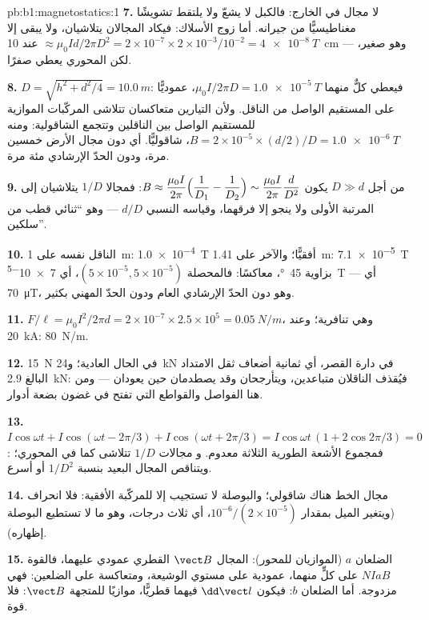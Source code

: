 \begin{solution}{pb:b1:magnetostatics:1}
\textbf{7.} لا مجال في الخارج: فالكبل لا يشعّ ولا يلتقط
تشويشًا مغناطيسيًّا من جيرانه. أما زوج الأسلاك: فيكاد المجالان
يتلاشيان، ولا يبقى إلا $\approx \mu_0Id/2\pi D^2 = 2 \times 10^{-7} \times 2 \times
10^{-3}/10^{-2} = \qty{4e-8}{T}$ عند \qty{10}{cm} --- وهو صغير، لكن المحوري يعطي
صفرًا.

\textbf{8.} $D = \sqrt{h^2 + d^2/4} = \qty{10.0}{m}$: فيعطي كلٌّ منهما $\mu_0I/2\pi D =
\qty{1.0e-5}{T}$، عموديًّا على المستقيم الواصل من الناقل. ولأن
التيارين متعاكسان تتلاشى المركّبات الموازية للمستقيم الواصل
بين الناقلين وتتجمع الشاقولية: ومنه $B = 2 \times 10^{-5} \times
(d/2)/D = \qty{1.0e-6}{T}$، شاقوليًّا. أي دون مجال الأرض خمسين مرة،
ودون الحدّ الإرشادي مئة مرة.

\textbf{9.} من أجل $D \gg d$ يكون $B \approx \dfrac{\mu_0I}{2\pi}\Bigl(\dfrac1{D_1} - \dfrac1{D_2}\Bigr)
\sim \dfrac{\mu_0I}{2\pi}\dfrac{d}{D^2}$: فمجالا $1/D$ يتلاشيان إلى المرتبة
الأولى ولا ينجو إلا فرقهما، وقياسه النسبي $d/D$ --- وهو
``ثنائي قطب من سلكين''.

\textbf{10.} الناقل نفسه على \qty{1}{m}: \qty{1.0e-4}{T} أفقيًّا؛ والآخر
على \qty{1.41}{m}: \qty{7.1e-5}{T} بزاوية \qty{45}{\degree}، معاكسًا: فالمحصلة
$(5 \times 10^{-5}, 5 \times 10^{-5})$، أي \qty{7e-5}{T} --- أي \qty{70}{\micro T}، وهو دون
الحدّ الإرشادي العام ودون الحدّ المهني بكثير.

\textbf{11.} $F/\ell = \mu_0I^2/2\pi d = 2 \times 10^{-7} \times 2.5 \times 10^5 =
\qty{0.05}{N/m}$، وهي تنافرية؛ وعند \qty{20}{kA}: \qty{80}{N/m}.

\textbf{12.} \qty{15}{N} في الحال العادية؛ و\qty{24}{kN} في دارة القصر، أي ثمانية أضعاف
ثقل الامتداد البالغ \qty{2.9}{kN}: فيُقذف الناقلان متباعدين، ويتأرجحان
وقد يصطدمان حين يعودان --- ومن هنا الفواصل والقواطع التي
تفتح في غضون بضعة أدوار.

\textbf{13.} $I\cos\omega t + I\cos(\omega t - 2\pi/3) + I\cos(\omega t + 2\pi/3) =
I\cos\omega t\,(1 + 2\cos2\pi/3) = 0$: فمجموع الأشعة الطورية الثلاثة معدوم. و
مجالات $1/D$ تتلاشى كما في المحوري؛ ويتناقص المجال البعيد بنسبة $1/D^2$ أو
أسرع.

\textbf{14.} مجال الخط هناك شاقولي؛ والبوصلة لا تستجيب إلا
للمركّبة الأفقية: فلا انحراف (ويتغير الميل بمقدار
$10^{-6}/(2 \times 10^{-5})$، أي ثلاث درجات، وهو ما لا تستطيع البوصلة إظهاره).

\textbf{15.} الضلعان $a$ (الموازيان للمحور): المجال $\vect B$ القطري
عمودي عليهما، فالقوة $NIaB$ على كلٍّ منهما، عمودية على
مستوي الوشيعة، ومتعاكسة على الضلعين: فهي مزدوجة. أما الضلعان $b$: فيكون $\dd\vect l$
فيهما قطريًّا، موازيًا للمتجهة $\vect B$: فلا قوة.


\end{solution}
